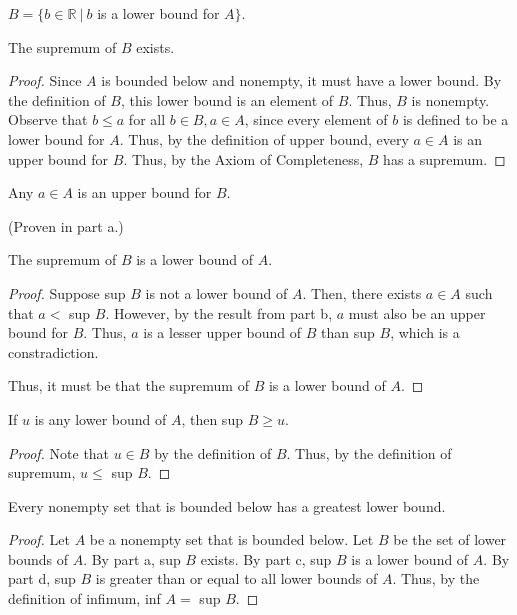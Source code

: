 \documentclass[12pt]{article}
\begin{document}
                   \begin{center} $B=\{b \in \mathbb R~|~b$ is a lower bound for $A\}$. \end{center}
                   
 The supremum of $B$ exists.

\begin{proof}
    Since $A$ is bounded below and nonempty, it must have a lower bound. By the definition of $B$, this lower bound is an element of $B$. Thus, $B$ is nonempty.  Observe that $b \leq a$ for all $b \in B, a \in A$, since every element of $b$ is defined to be a lower bound for $A$. Thus, by the definition of upper bound, every $a \in A$ is an upper bound for $B$. Thus, by the Axiom of Completeness, $B$ has a supremum.

\end{proof}

\medskip
{} Any $a \in A$ is an upper bound for $B$.

(Proven in part a.)

\medskip
{} The supremum of $B$ is a lower bound of $A$.

\begin{proof}
    Suppose sup $B$ is not a lower bound of $A$. Then, there exists $a \in A$ such that $a <$ sup $B$. However, by the result from part b, $a$ must also be an upper bound for $B$. Thus, $a$ is a lesser upper bound of $B$ than sup $B$, which is a constradiction.
    
    Thus, it must be that the supremum of $B$ is a lower bound of $A$.
\end{proof}

\medskip
{} If $u$ is any lower bound of $A$, then sup $B \geq u$.

\begin{proof}
    Note that $u \in B$ by the definition of $B$. Thus, by the definition of supremum, $u \leq$ sup $B$.
\end{proof}

\medskip
{} Every nonempty set that is bounded below has a greatest lower bound.

\begin{proof}
    Let $A$ be a nonempty set that is bounded below. Let $B$ be the set of lower bounds of $A$. By part a, sup $B$ exists. By part c, sup $B$ is a lower bound of $A$. By part d, sup $B$ is greater than or equal to all lower bounds of $A$. Thus, by the definition of infimum, inf $A =$ sup $B$.
\end{proof}
\end{document}
